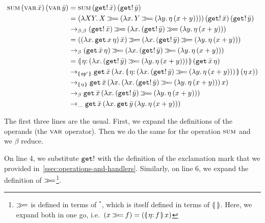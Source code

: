 \begin{align*}
  \sumecn{\varec{x}}{\varec{y}}
& = \sumecn{(\ap{\op{get}!}{\bar{x}})}
           {(\ap{\op{get}!}{\bar{y}})} \\
& = \app{(\lam{X Y}{X \hsbind (\lam{x}{Y \hsbind (\lam{y}{\ap{\eta}{(x + y)}})})})}
        {(\ap{\op{get}!}{\bar{x}})}
        {(\ap{\op{get}!}{\bar{y}})} \\
& \to_{\beta,\beta} (\ap{\op{get}!}{\bar{x}}) \hsbind (\lam{x}{
                       (\ap{\op{get}!}{\bar{y}}) \hsbind (\lam{y}{
                        \ap{\eta}{(x + y)}})}) \\
& = (\ap{(\lam{x}{\app{\op{get}}{x}{\eta}})}{\bar{x}}) \hsbind (\lam{x}{
    (\ap{\op{get}!}{\bar{y}}) \hsbind (\lam{y}{
     \ap{\eta}{(x + y)}})}) \\
& \to_{\beta} (\app{\op{get}}{\bar{x}}{\eta}) \hsbind (\lam{x}{
    (\ap{\op{get}!}{\bar{y}}) \hsbind (\lam{y}{
     \ap{\eta}{(x + y)}})}) \\
& = \ap{\banana{\onto{\eta}{(\lam{x}{(\ap{\op{get}!}{\bar{y}}) \hsbind (\lam{y}{
    \ap{\eta}{(x + y)}})})}}}{(\app{\op{get}}{\bar{x}}{\eta})} \\
& \to_{\banana{\op{op}'}} \app{\op{get}}{\bar{x}}
        {(\lam{x}{\ap{\banana{\onto{\eta}{(\lam{x}{(\ap{\op{get}!}{\bar{y}})
                    \hsbind (\lam{y}{\ap{\eta}{(x + y)}})})}}}{(\ap{\eta}{x})}})} \\
& \to_{\banana{\eta}} \app{\op{get}}{\bar{x}}
        {(\lam{x}{\ap{(\lam{x}{(\ap{\op{get}!}{\bar{y}})
                    \hsbind (\lam{y}{\ap{\eta}{(x + y)}})})}{x}})} \\
& \to_{\beta} \app{\op{get}}{\bar{x}}
        {(\lam{x}{(\ap{\op{get}!}{\bar{y}})
                    \hsbind (\lam{y}{\ap{\eta}{(x + y)}})})} \\
& \to_{\ldots} \app{\op{get}}{\bar{x}}
        {(\lam{x}{\app{\op{get}}{\bar{y}}{(\lam{y}{\ap{\eta}{(x + y)}})}})} \\
\end{align*}

The first three lines are the usual. First, we expand the definitions of
the operands (the $\textsc{var}$ operator). Then we do the same for the operation
$\textsc{sum}$ and we $\beta$ reduce.

On line 4, we substitute $\mathtt{get}!$ with the definition of the exclamation
mark that we provided in~\ref{ssec:operations-and-handlers}. Similarly, on
line 6, we expand the definition of $\mathbin{\gg\!=}$\footnote{$\mathbin{\gg\!=}$ is defined
  in terms of $^*$, which is itself defined in terms of $\llparenthesis \,  \, \rrparenthesis$. Here,
  we expand both in one go, i.e.\ $(x \hsbind f) =
  (\ap{\banana{\onto{\eta}{f}}}{x})$}.


